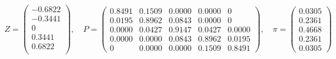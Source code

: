 \documentclass{ltjsarticle}
\begin{document}
\begin{gather*}
    Z = \begin{pmatrix}
        -0.6822\\
        -0.3441\\
        0 \\
        0.3441\\
        0.6822\\
    \end{pmatrix}
    , \quad
    P = \begin{pmatrix}
        0.8491  &  0.1509  &  0.0000  &  0.0000  &       0\\
        0.0195  &  0.8962  &  0.0843  &  0.0000  &       0\\
        0.0000  &  0.0427  &  0.9147  &  0.0427  &  0.0000\\
        0.0000  &  0.0000  &  0.0843  &  0.8962  &  0.0195\\
        0  &  0.0000  &  0.0000  &  0.1509  &  0.8491
    \end{pmatrix}
    , \quad
    \pi = \begin{pmatrix}
        0.0305\\
        0.2361\\
        0.4668\\
        0.2361\\
        0.0305
    \end{pmatrix}
\end{gather*}
\end{document}
